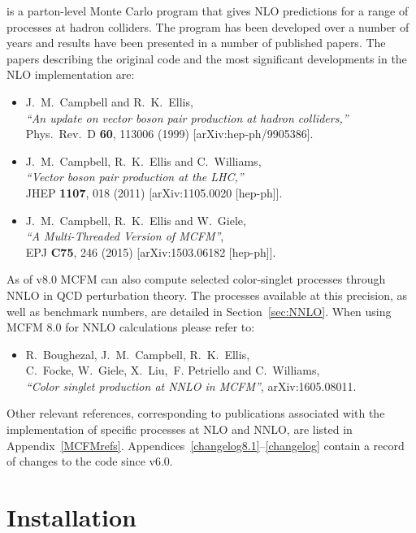 \documentclass{article}
\begin{document}
\MCFM is a parton-level Monte Carlo program that gives NLO predictions
for a range of processes at hadron colliders. The program has been
developed over a number of years and results have been presented in
a number of published papers.  The papers describing the original
code and the most significant developments in the NLO implementation are:
\begin{itemize}
\item J.~M.~Campbell and R.~K.~Ellis, \\
  {\it ``An update on vector boson pair production at hadron colliders,''} \\
  Phys.\ Rev.\ D {\bf 60}, 113006 (1999)
  [arXiv:hep-ph/9905386].
\item J.~M.~Campbell, R.~K.~Ellis and C.~Williams, \\
  {\it ``Vector boson pair production at the LHC,''} \\
  JHEP {\bf 1107}, 018 (2011)
  [arXiv:1105.0020 [hep-ph]]. 
\item J.~M.~Campbell, R.~K.~Ellis and W.~Giele, \\
  {\it ``A Multi-Threaded Version of MCFM''}, \\
    EPJ {\bf C75}, 246 (2015)
    [arXiv:1503.06182 [hep-ph]].
\end{itemize}
 
As of v8.0 MCFM can also compute selected color-singlet processes through NNLO in QCD
perturbation theory.  The processes available at this precision, as well as
benchmark numbers, are detailed in Section~\ref{sec:NNLO}.  When using MCFM 8.0
for NNLO calculations please refer to:
\begin{itemize}
\item 
  R.~Boughezal, J.~M.~Campbell, R.~K.~Ellis, \\
   C.~Focke, W.~Giele, X.~Liu,~F. Petriello and  C.~Williams, \\
  {\it ``Color singlet production at NNLO in MCFM''},
  arXiv:1605.08011.
\end{itemize}

Other relevant references, corresponding to publications associated with the
implementation of specific processes at NLO and NNLO, are listed
in Appendix~\ref{MCFMrefs}.  Appendices~\ref{changelog8.1}--\ref{changelog} contain
a record of changes to the code since v6.0.

\section{Installation}
\end{document}
